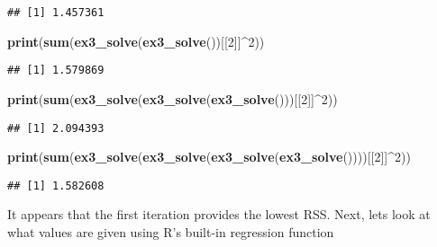 \documentclass[
]{article}
\newenvironment{Shaded}{\begin{snugshade}}{\end{snugshade}}
\newcommand{\DataTypeTok}[1]{\textcolor[rgb]{0.13,0.29,0.53}{#1}}
\newcommand{\DecValTok}[1]{\textcolor[rgb]{0.00,0.00,0.81}{#1}}
\newcommand{\KeywordTok}[1]{\textcolor[rgb]{0.13,0.29,0.53}{\textbf{#1}}}
\newcommand{\NormalTok}[1]{#1}
\newcommand{\OperatorTok}[1]{\textcolor[rgb]{0.81,0.36,0.00}{\textbf{#1}}}
\newcommand{\StringTok}[1]{\textcolor[rgb]{0.31,0.60,0.02}{#1}}
\begin{document}
\begin{verbatim}
## [1] 1.457361
\end{verbatim}

\begin{Shaded}
\begin{Highlighting}[]
\KeywordTok{print}\NormalTok{(}\KeywordTok{sum}\NormalTok{(}\KeywordTok{ex3\_solve}\NormalTok{(}\KeywordTok{ex3\_solve}\NormalTok{())[[}\DecValTok{2}\NormalTok{]]}\OperatorTok{\^{}}\DecValTok{2}\NormalTok{))}
\end{Highlighting}
\end{Shaded}

\begin{verbatim}
## [1] 1.579869
\end{verbatim}

\begin{Shaded}
\begin{Highlighting}[]
\KeywordTok{print}\NormalTok{(}\KeywordTok{sum}\NormalTok{(}\KeywordTok{ex3\_solve}\NormalTok{(}\KeywordTok{ex3\_solve}\NormalTok{(}\KeywordTok{ex3\_solve}\NormalTok{()))[[}\DecValTok{2}\NormalTok{]]}\OperatorTok{\^{}}\DecValTok{2}\NormalTok{))}
\end{Highlighting}
\end{Shaded}

\begin{verbatim}
## [1] 2.094393
\end{verbatim}

\begin{Shaded}
\begin{Highlighting}[]
\KeywordTok{print}\NormalTok{(}\KeywordTok{sum}\NormalTok{(}\KeywordTok{ex3\_solve}\NormalTok{(}\KeywordTok{ex3\_solve}\NormalTok{(}\KeywordTok{ex3\_solve}\NormalTok{(}\KeywordTok{ex3\_solve}\NormalTok{())))[[}\DecValTok{2}\NormalTok{]]}\OperatorTok{\^{}}\DecValTok{2}\NormalTok{))}
\end{Highlighting}
\end{Shaded}

\begin{verbatim}
## [1] 1.582608
\end{verbatim}

It appears that the first iteration provides the lowest RSS. Next, lets
look at what values are given using R's built-in regression function

\begin{Shaded}
\end{Shaded}
\end{document}
